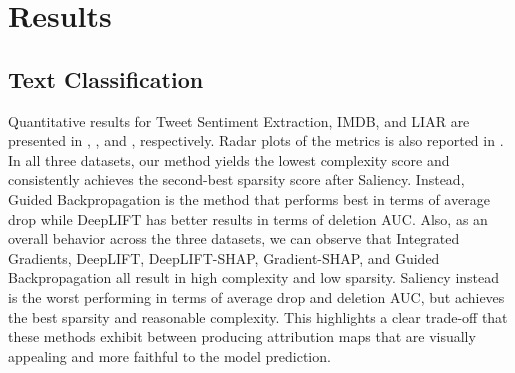 \chapter{Results} \label{ch:results}


\section{Text Classification}

Quantitative results for Tweet Sentiment Extraction, IMDB, and LIAR are presented in , , and , respectively. Radar plots of the metrics is also reported in . In all three datasets, our method yields the lowest complexity score and consistently achieves the second-best sparsity score after Saliency. Instead, Guided Backpropagation is the method that performs best in terms of average drop while DeepLIFT has better results in terms of deletion AUC. Also, as an overall behavior across the three datasets, we can observe that Integrated Gradients, DeepLIFT, DeepLIFT-SHAP, Gradient-SHAP, and Guided Backpropagation all result in high complexity and low sparsity. Saliency instead is the worst performing in terms of average drop and deletion AUC, but achieves the best sparsity and reasonable complexity. This highlights a clear trade-off that these methods exhibit between producing attribution maps that are visually appealing and more faithful to the model prediction.

